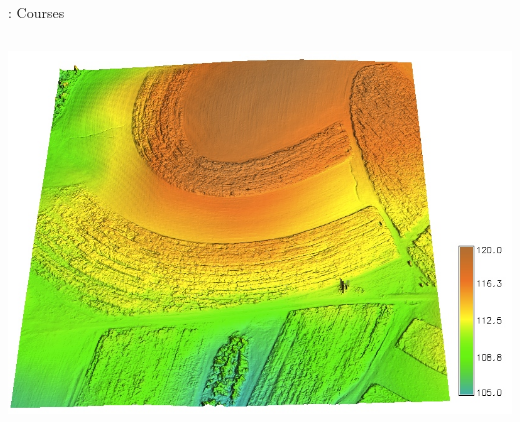 \documentclass[xcolor={dvipsnames,usenames},beamer,aspectratio=169]{beamer}
\begin{document}
\begin{frame}{\geoforalllab: Courses}
\begin{columns}[c]
\includegraphics[height=0.5\textheight]{./images/edu/dem}
\hspace{0.2\textwidth}
\end{columns}

\end{frame}
\end{document}
